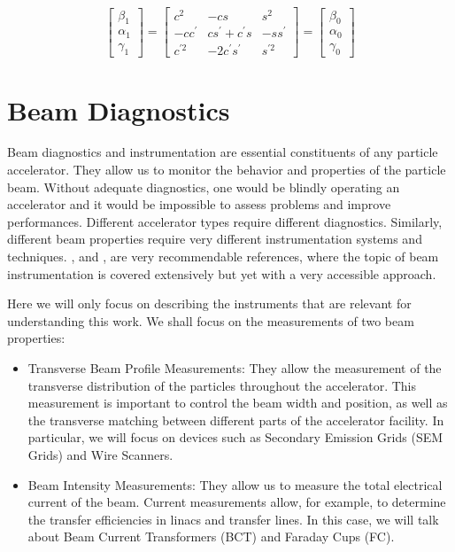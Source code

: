 \begin{equation}
    \begin{bmatrix}
       \beta_1 \\ \alpha_1 \\ \gamma_1
    \end{bmatrix}
    =
\begin{bmatrix}
   c^2 & - c s & s^2 \\ -c c^{'} & cs^{'} + c^{'}s & -s s^{'} \\ c^{'2} & -2c^{'}s^{'} & s^{'2}
\end{bmatrix}
=
\begin{bmatrix}
   \beta_0 \\ \alpha_0 \\ \gamma_0
\end{bmatrix}
\label{eq:MatrixEq}
\end{equation}

\section{Beam Diagnostics}

Beam diagnostics and instrumentation are essential constituents of any particle accelerator. They allow us to monitor the behavior and properties of the particle beam. Without adequate diagnostics, one would be blindly operating an accelerator and it would be impossible to assess problems and improve performances. Different accelerator types require different diagnostics. Similarly, different beam properties require very different instrumentation systems and techniques.  \parencite*[][]{ref:BeamInstrumentationBook}, \parencite*[][]{ref:NotesBeamInst} and \parencite*[][]{ref:CASbeamInst}, are very recommendable references, where the topic of beam instrumentation is covered extensively but yet with a very accessible approach. 

Here we will only focus on describing the instruments that are relevant for understanding this work. We shall focus on the measurements of two beam properties: 

\begin{itemize}
    \item Transverse Beam Profile Measurements: They allow the measurement of the transverse distribution of the particles throughout the accelerator. This measurement is important to control the beam width and position, as well as the transverse matching between different parts of the accelerator facility. In particular, we will focus on devices such as Secondary Emission Grids (SEM Grids) and Wire Scanners. 
    \item Beam Intensity Measurements: They allow us to measure the total electrical current of the beam. Current measurements allow, for example, to determine the transfer efficiencies in linacs and transfer lines. In this case, we will talk about Beam Current Transformers (BCT) and Faraday Cups (FC).
\end{itemize}

